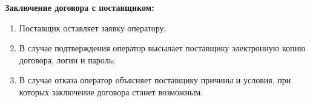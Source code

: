 {\bf Заключение договора с поставщиком:}
\begin{enumerate}
  \item{Поставщик оставляет заявку оператору;}
  \item{В случае подтверждения оператор высылает поставщику электронную копию договора, логин и пароль;}
  \item{В случае отказа оператор объясняет поставщику причины и условия, при которых заключение договора станет возможным.}
\end{enumerate}

\endinput
